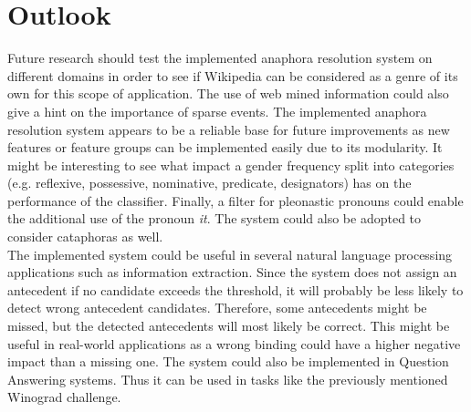 \section{Outlook}
Future research should test the implemented anaphora resolution system on different domains in order to see if Wikipedia can be considered as a genre of its own for this scope of application. The use of web mined information could also give a hint on the importance of sparse events. The implemented anaphora resolution system appears to be a reliable base for future improvements as new features or feature groups can be implemented easily due to its modularity. It might be interesting to see what impact a gender frequency split into categories (e.g. reflexive, possessive, nominative, predicate, designators) has on the performance of the classifier. Finally, a filter for pleonastic pronouns could enable the additional use of the pronoun \textit{it}. The system could also be adopted to consider cataphoras as well. \\
The implemented system could be useful in several natural language processing applications such as information extraction. Since the system does not assign an antecedent if no candidate exceeds the threshold, it will probably be less likely to detect wrong antecedent candidates. Therefore, some antecedents might be missed, but the detected antecedents will most likely be correct. This might be useful in real-world applications as a wrong binding could have a higher negative impact than a missing one. The system could also be implemented in Question Answering systems. Thus it can be used in tasks like the previously mentioned Winograd challenge.